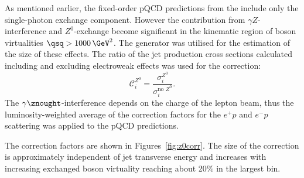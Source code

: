 As mentioned earlier, the fixed-order pQCD predictions from the \nlojet include only the single-photon exchange component. However the contribution from $\gamma Z$-interference and $Z^0$-exchange become significant in the kinematic region of boson virtualities $\qsq > 1000\, \GeV^{2}$. The \lepto generator was utilised for the estimation of the size of these effects. The ratio of the jet production cross sections calculated including and excluding electroweak effects was used for the correction:
\begin{equation}
 \mathcal{C}^\text{$Z^0$}_i = \frac{\sigma_i^\text{$Z^0$}}{\sigma_i^\text{no $Z^0$}}.
 \label{eq:z0corr}
\end{equation}
The $\gamma\znought$-interference depends on the charge of the lepton beam, thus the lumi\-nosity-weighted average of the correction factors for the $e^+p$ and $e^-p$ scattering was applied to the pQCD predictions.

The correction factors are shown in Figures~\ref{fig:z0corr}. The size of the correction is approximately independent of jet transverse energy and increases with increasing exchanged boson virtuality reaching about 20\% in the largest \qsq bin.


